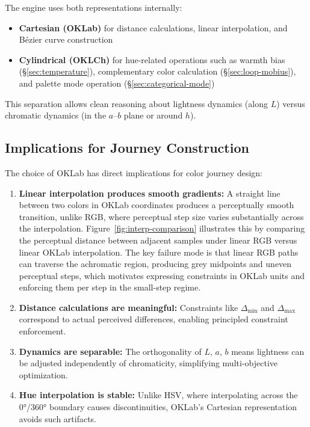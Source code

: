 The engine uses both representations internally:
\begin{itemize}
    \item \textbf{Cartesian (OKLab)} for distance calculations, linear interpolation, and Bézier curve construction
    \item \textbf{Cylindrical (OKLCh)} for hue-related operations such as warmth bias (\S\ref{sec:temperature}), complementary color calculation (\S\ref{sec:loop-mobius}), and palette mode operation (\S\ref{sec:categorical-mode})
\end{itemize}

This separation allows clean reasoning about lightness dynamics (along $L$) versus chromatic dynamics (in the $a$–$b$ plane or around $h$).

\subsection{Implications for Journey Construction}

The choice of OKLab has direct implications for color journey design:

\begin{enumerate}
  \item \textbf{Linear interpolation produces smooth gradients:} A straight line between two colors in OKLab coordinates produces a perceptually smooth transition, unlike RGB, where perceptual step size varies substantially across the interpolation. Figure~\ref{fig:interp-comparison} illustrates this by comparing the perceptual distance between adjacent samples under linear RGB versus linear OKLab interpolation. The key failure mode is that linear RGB paths can traverse the achromatic region, producing grey midpoints and uneven perceptual steps, which motivates expressing constraints in OKLab units and enforcing them per step in the small-step regime.
    
    \item \textbf{Distance calculations are meaningful:} Constraints like $\Delta_{\min}$ and $\Delta_{\max}$ correspond to actual perceived differences, enabling principled constraint enforcement.
    
    \item \textbf{Dynamics are separable:} The orthogonality of $L$, $a$, $b$ means lightness can be adjusted independently of chromaticity, simplifying multi-objective optimization.
    
    \item \textbf{Hue interpolation is stable:} Unlike HSV, where interpolating across the 0°/360° boundary causes discontinuities, OKLab's Cartesian representation avoids such artifacts.
\end{enumerate}

